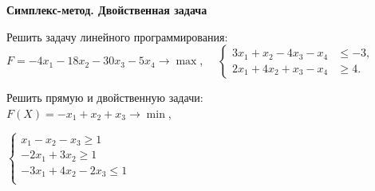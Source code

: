\documentclass[a5paper,14pt]{extarticle}
\begin{document}
\begin{enumerate}
  {\item[]
          \bfseries Симплекс-метод. Двойственная задача
          \par\vspace{1mm}
  }
  


\item Решить задачу линейного программирования:\\
    $F = -4x_1 -18x_2 - 30x_3 -5x_4  \to \max$,
    $\quad
    \left\lbrace\begin{aligned}
    3x_1 + x_2 - 4x_3 - x_4 & \leqslant -3,\\
    2x_1 + 4x_2 + x_3 - x_4 &\geqslant 4.
    \end{aligned}\right.
    $


\item Решить прямую и двойственную задачи:\\
$F(X)= -x_1 + x_2 + x_3 \to \min$,\qquad

$
\left\lbrace
\begin{aligned}
x_1-x_2-x_3 \geqslant 1\\
-2x_1+3x_2 \geqslant 1\\
-3x_1+4x_2-2x_3 \leqslant 1\\
\end{aligned}
\right.
$


\end{enumerate}
\end{document}
